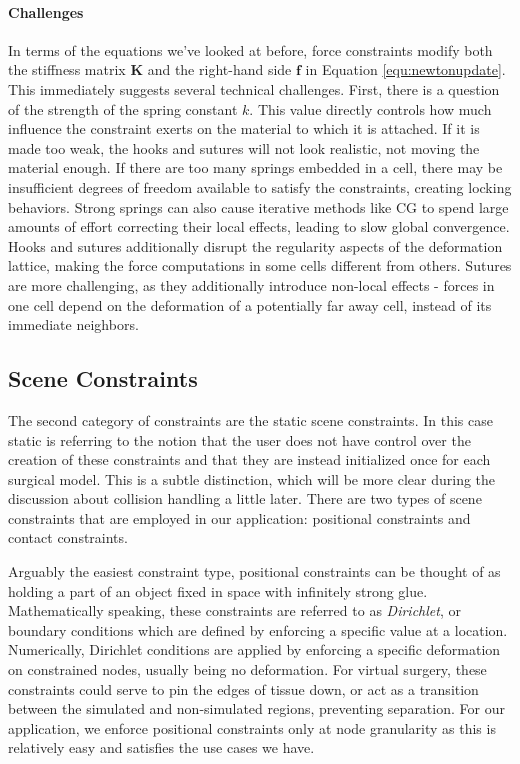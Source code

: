   \paragraph{Challenges} In terms of the equations we've looked at before, force constraints
  modify both the stiffness matrix $\bm K$ and the right-hand side
  $\mathbf f$ in Equation \ref{equ:newtonupdate}. This immediately
  suggests several technical challenges. First, there is a question of
  the strength of the spring constant $k$. This value directly
  controls how much influence the constraint exerts on the material to
  which it is attached. If it is made too weak, the hooks and sutures
  will not look realistic, not moving the material enough. If there
  are too many springs embedded in a cell, there may be insufficient
  degrees of freedom available to satisfy the constraints, creating
  locking behaviors. Strong springs can also cause iterative methods
  like CG to spend large amounts of effort correcting their local
  effects, leading to slow global convergence.  Hooks and sutures
  additionally disrupt the regularity aspects of the deformation
  lattice, making the force computations in some cells different from
  others. Sutures are more challenging, as they additionally introduce
  non-local effects - forces in one cell depend on the deformation of
  a potentially far away cell, instead of its immediate neighbors.
  
  \subsection{Scene Constraints}

  The second category of constraints are the static scene
  constraints. In this case static is referring to the notion that the
  user does not have control over the creation of these constraints
  and that they are instead initialized once for each surgical
  model. This is a subtle distinction, which will be more clear during
  the discussion about collision handling a little later. There are
  two types of scene constraints that are employed in our application:
  positional constraints and contact constraints. 

  Arguably the easiest constraint type, positional constraints can be
  thought of as holding a part of an object fixed in space with
  infinitely strong glue. Mathematically speaking, these constraints
  are referred to as \textit{Dirichlet}, or boundary conditions which
  are defined by enforcing a specific value at a
  location. Numerically, Dirichlet conditions are applied by enforcing
  a specific deformation on constrained nodes, usually being no
  deformation. For virtual surgery, these constraints could serve to
  pin the edges of tissue down, or act as a transition between the
  simulated and non-simulated regions, preventing separation. For our
  application, we enforce positional constraints only at node
  granularity as this is relatively easy and satisfies the use cases
  we have.

